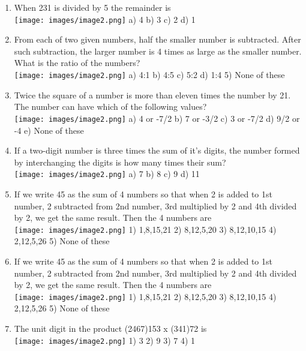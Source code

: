 \documentclass[
]{article}
\begin{document}
\begin{enumerate}
	\item When 231 is divided by 5 the remainder is \\
	\texttt{[image: images/image2.png]} a) 4 b) 3 c) 2 d) 1
	
	\item From each of two given numbers, half the smaller number is subtracted. After such subtraction, the larger number is 4 times as large as the smaller number. What is the ratio of the numbers? \\
	\texttt{[image: images/image2.png]} a) 4:1 b) 4:5 c) 5:2 d) 1:4 5) None of these
	
	\item Twice the square of a number is more than eleven times the number by 21. The number can have which of the following values? \\
	\texttt{[image: images/image2.png]} a) 4 or -7/2 b) 7 or -3/2 c) 3 or -7/2 d) 9/2 or -4 e) None of these
	
	\item If a two-digit number is three times the sum of it's digits, the number formed by interchanging the digits is how many times their sum? \\
	\texttt{[image: images/image2.png]} a) 7 b) 8 c) 9 d) 11
	
	\item If we write 45 as the sum of 4 numbers so that when 2 is added to 1st number, 2  subtracted from 2nd number, 3rd multiplied by 2 and 4th divided by 2, we get the same result. Then the 4 numbers are \\
	\texttt{[image: images/image2.png]} 1) 1,8,15,21 2) 8,12,5,20 3) 8,12,10,15 4) 2,12,5,26 5) None of these
	
	\item If we write 45 as the sum of 4 numbers so that when 2 is added to 1st number, 2  subtracted from 2nd number, 3rd multiplied by 2 and 4th divided by 2, we get the same result. Then the 4 numbers are \\
	\texttt{[image: images/image2.png]} 1) 1,8,15,21  2) 8,12,5,20  3) 8,12,10,15  4) 2,12,5,26 5) None of these
	
	


\item The unit digit in the product (2467)153 x (341)72 is \\
\texttt{[image: images/image2.png]} 1) 3 2) 9 3) 7 4) 1


\end{enumerate}
\end{document}
